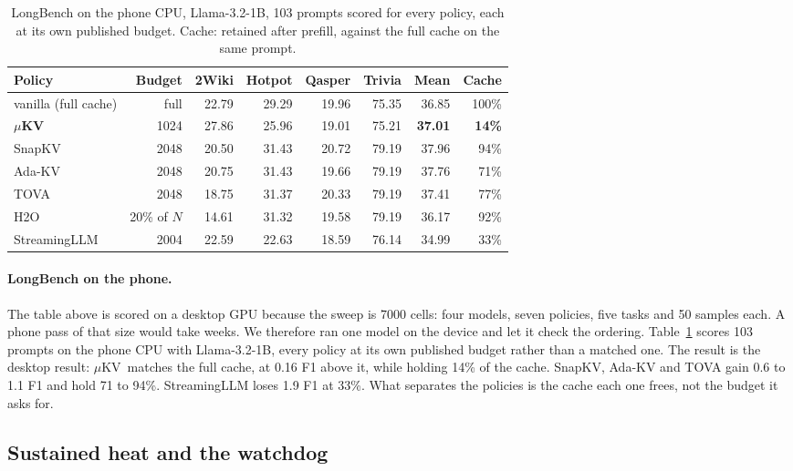 \documentclass[sigconf, anonymous=false, screen=true]{acmart}
\newcommand{\good}[1]{\textcolor{kvgreen}{\textbf{#1}}}
\newcommand{\muKV}{$\mu$KV}
\begin{document}
\begin{table}[tb]
\caption{LongBench on the phone CPU, Llama-3.2-1B, 103 prompts scored for every policy, each at its own published budget. Cache: retained after prefill, against the full cache on the same prompt.}
\label{tab:longbench-phone}
\centering\footnotesize
\setlength{\tabcolsep}{3.5pt}
\begin{tabular}{l r r r r r r r}
\toprule
\textbf{Policy} & \textbf{Budget} & \textbf{2Wiki} & \textbf{Hotpot} & \textbf{Qasper} & \textbf{Trivia} & \textbf{Mean} & \textbf{Cache} \\
\midrule
vanilla (full cache) & full     & 22.79 & 29.29 & 19.96 & 75.35 & 36.85 & 100\% \\
\textbf{\muKV}       & 1024     & 27.86 & 25.96 & 19.01 & 75.21 & \good{37.01} & \good{14\%} \\
SnapKV               & 2048     & 20.50 & 31.43 & 20.72 & 79.19 & 37.96 & 94\% \\
Ada-KV               & 2048     & 20.75 & 31.43 & 19.66 & 79.19 & 37.76 & 71\% \\
TOVA                 & 2048     & 18.75 & 31.37 & 20.33 & 79.19 & 37.41 & 77\% \\
H2O                  & 20\% of $N$ & 14.61 & 31.32 & 19.58 & 79.19 & 36.17 & 92\% \\
StreamingLLM         & 2004     & 22.59 & 22.63 & 18.59 & 76.14 & 34.99 & 33\% \\
\bottomrule
\end{tabular}
\end{table}

\paragraph{LongBench on the phone.} The table above is scored on a desktop GPU because the sweep is 7000 cells: four models, seven policies, five tasks and 50 samples each. A phone pass of that size would take weeks. We therefore ran one model on the device and let it check the ordering. Table~\ref{tab:longbench-phone} scores 103 prompts on the phone CPU with Llama-3.2-1B, every policy at its own published budget rather than a matched one. The result is the desktop result: \muKV\ matches the full cache, at 0.16 F1 above it, while holding 14\% of the cache. SnapKV, Ada-KV and TOVA gain 0.6 to 1.1 F1 and hold 71 to 94\%. StreamingLLM loses 1.9 F1 at 33\%. What separates the policies is the cache each one frees, not the budget it asks for.

\subsection{Sustained heat and the watchdog}
\label{sec:eval-thermal}
\end{document}
